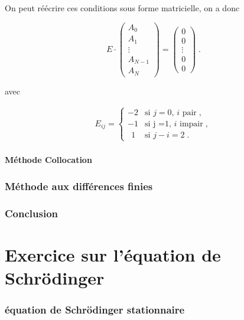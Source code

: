 \documentclass{report}
\begin{document}
On peut réécrire ces conditions sous forme matricielle, on a donc

\begin{equation}
E \cdot
\begin{pmatrix}
 A_{0}\\ 
 A_{1}\\ 
 \vdots\\ 
 A_{N-1}\\ 
 A_{N}
\end{pmatrix} 
= 
\begin{pmatrix}
 0\\ 
 0\\ 
 \vdots\\ 
 0\\ 
 0
\end{pmatrix}\;.
\end{equation}

avec

\begin{align}
E_{ij} = \begin{cases}
-2 & \text{si $j=0$, $i$ pair}\;, \\
-1 & \text{si j =1, $i$ impair}\;,\\
\ \ 1 & \text{si $j-i=2$}\;.
  \end{cases}
\end{align}


\subsection{Méthode Collocation}

\section{Méthode aux différences finies}

\section{Conclusion}


 \part{Exercice sur l'équation de Schrödinger}
\setcounter{section}{0}
 


\section{équation de Schrödinger stationnaire}
\end{document}
